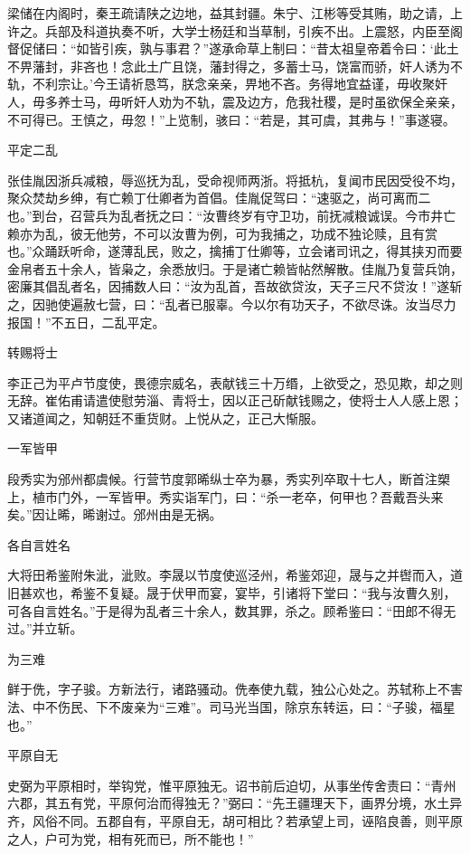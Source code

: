 \documentclass[a4paper,12pt,UTF8,twoside]{ctexbook}
\begin{document}
    梁储在内阁时，秦王疏请陕之边地，益其封疆。朱宁、江彬等受其贿，助之请，上许之。兵部及科道执奏不听，大学士杨廷和当草制，引疾不出。上震怒，内臣至阁督促储曰：“如皆引疾，孰与事君？”遂承命草上制曰：“昔太祖皇帝着令曰：‘此土不畀藩封，非吝也！念此土广且饶，藩封得之，多蓄士马，饶富而骄，奸人诱为不轨，不利宗让。’今王请祈恳笃，朕念亲亲，畀地不吝。务得地宜益谨，毋收聚奸人，毋多养士马，毋听奸人劝为不轨，震及边方，危我社稷，是时虽欲保全亲亲，不可得已。王慎之，毋忽！”上览制，骇曰：“若是，其可虞，其弗与！”事遂寝。
    
    平定二乱
    
    张佳胤因浙兵减粮，辱巡抚为乱，受命视师两浙。将抵杭，复闻市民因受役不均，聚众焚劫乡绅，有亡赖丁仕卿者为首倡。佳胤促驾曰：“速驱之，尚可离而二也。”到台，召营兵为乱者抚之曰：“汝曹终岁有守卫功，前抚减粮诚误。今市井亡赖亦为乱，彼无他劳，不可以汝曹为例，可为我捕之，功成不独论赎，且有赏也。”众踊跃听命，遂薄乱民，败之，擒捕丁仕卿等，立会诸司讯之，得其挟刃而要金帛者五十余人，皆枭之，余悉放归。于是诸亡赖皆帖然解散。佳胤乃复营兵饷，密廉其倡乱者名，因捕数人曰：“汝为乱首，吾故欲贷汝，天子三尺不贷汝！”遂斩之，因驰使遍赦七营，曰：“乱者已服辜。今以尔有功天子，不欲尽诛。汝当尽力报国！”不五日，二乱平定。
    
    转赐将士
    
    李正己为平卢节度使，畏德宗威名，表献钱三十万缗，上欲受之，恐见欺，却之则无辞。崔佑甫请遣使慰劳淄、青将士，因以正己斫献钱赐之，使将士人人感上恩；又诸道闻之，知朝廷不重货财。上悦从之，正己大惭服。
    
    一军皆甲
    
    段秀实为邠州都虞候。行营节度郭晞纵士卒为暴，秀实列卒取十七人，断首注槊上，植市门外，一军皆甲。秀实诣军门，曰：“杀一老卒，何甲也？吾戴吾头来矣。”因让晞，晞谢过。邠州由是无祸。
    
    各自言姓名
    
    大将田希鉴附朱泚，泚败。李晟以节度使巡泾州，希鉴郊迎，晟与之并辔而入，道旧甚欢也，希鉴不复疑。晟于伏甲而宴，宴毕，引诸将下堂曰：“我与汝曹久别，可各自言姓名。”于是得为乱者三十余人，数其罪，杀之。顾希鉴曰：“田郎不得无过。”并立斩。
    
    为三难
    
    鲜于侁，字子骏。方新法行，诸路骚动。侁奉使九载，独公心处之。苏轼称上不害法、中不伤民、下不废亲为“三难”。司马光当国，除京东转运，曰：“子骏，福星也。”
    
    平原自无
    
    史弼为平原相时，举钩党，惟平原独无。诏书前后迫切，从事坐传舍责曰：“青州六郡，其五有党，平原何治而得独无？”弼曰：“先王疆理天下，画界分境，水土异齐，风俗不同。五郡自有，平原自无，胡可相比？若承望上司，诬陷良善，则平原之人，户可为党，相有死而已，所不能也！”
    
\end{document}
